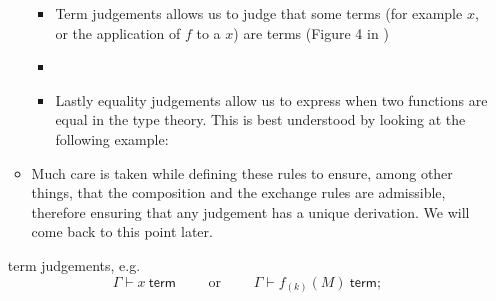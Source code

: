 \documentclass[pra,floatfix,
amsmath,superscriptaddress, 12pt]{article}
\theoremstyle{definition}
\newcommand{\fF}{\mathfrak{F}}
\newcommand{\cG}{\mathcal{G}}
\newcommand{\cR}{\mathcal{R}}
\newcommand{\mc}[1]{\mathcal{#1}}
\begin{document}
\begin{enumerate}
\begin{itemize}
    \begin{itemize}
    \item Term judgements allows us to judge that some terms (for example $x$, or the application of $f$ to a $x$) are terms (Figure 4 in \cite{Shulman})
    \item    
    \item Lastly equality judgements allow us to express when two functions are equal in the type theory. This is best understood by looking at the following example: 
     \end{itemize}
	\item Much care is taken while defining these rules to ensure, among other things, that the composition and the exchange rules are admissible, therefore ensuring that any judgement has a unique derivation. We will come back to this point later. %
		\end{itemize}



term judgements, e.g. 
\[
\Gamma\vdash x\ \mathsf{term} \qquad \textrm{ or } \qquad \Gamma\vdash f_{\left(k\right)}\left(M\right)\ \mathsf{term};
\]


\end{enumerate}
\end{document}

